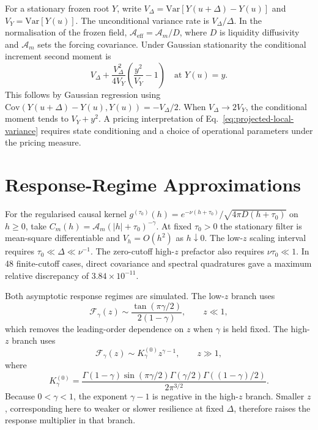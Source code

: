 \documentclass[11pt]{article}
\newcommand{\Aeff}{\mathcal A_{\mathrm{eff}}}
\newcommand{\Fresp}{\mathcal F}
\begin{document}
For a stationary frozen root \(Y\), write
\(V_\Delta=\mathrm{Var}[Y(u+\Delta)-Y(u)]\) and \(V_Y=\mathrm{Var}[Y(u)]\).
The unconditional variance rate is \(V_\Delta/\Delta\). In the normalisation
of the frozen field, \(\Aeff=\mathcal A_m/D\), where \(D\) is liquidity
diffusivity and \(\mathcal A_m\) sets the forcing covariance. Under Gaussian
stationarity the conditional increment second moment is
\[
 V_\Delta+\frac{V_\Delta^2}{4V_Y}\left(\frac{y^2}{V_Y}-1\right)
 \quad\text{at }Y(u)=y .
\]
This follows by Gaussian regression using
\(\mathrm{Cov}(Y(u+\Delta)-Y(u),Y(u))=-V_\Delta/2\).
When \(V_\Delta\to2V_Y\), the conditional moment tends to \(V_Y+y^2\).
A pricing interpretation of Eq.~\eqref{eq:projected-local-variance}
requires state conditioning and a choice of operational parameters under
the pricing measure.

\section{Response-Regime Approximations}

For the regularised causal kernel
\(g^{(\tau_0)}(h)=e^{-\nu(h+\tau_0)}/\sqrt{4\pi D(h+\tau_0)}\)
on \(h\ge0\), take \(C_m(h)=\mathcal A_m(|h|+\tau_0)^{-\gamma}\).
At fixed \(\tau_0>0\) the stationary filter is mean-square differentiable
and \(V_h=O(h^2)\) as \(h\downarrow0\). The low-\(z\) scaling interval
requires \(\tau_0\ll\Delta\ll\nu^{-1}\). The zero-cutoff high-\(z\)
prefactor also requires \(\nu\tau_0\ll1\). In 48 finite-cutoff cases,
direct covariance and spectral quadratures gave a maximum relative
discrepancy of \(3.84\times10^{-11}\).

Both asymptotic response regimes are simulated. The low-\(z\) branch uses
\begin{equation}
 \Fresp_\gamma(z)
 \sim
 \frac{\tan(\pi\gamma/2)}{2(1-\gamma)},
 \qquad z\ll1,
 \label{eq:low-z-response}
\end{equation}
which removes the leading-order dependence on \(z\) when \(\gamma\) is held
fixed. The high-\(z\) branch uses
\begin{equation}
 \Fresp_\gamma(z)
 \sim
 K_\gamma^{(0)}z^{\gamma-1},
 \qquad z\gg1,
 \label{eq:high-z-response}
\end{equation}
where
\begin{equation}
 K_\gamma^{(0)}
 =
 \frac{
 \Gamma(1-\gamma)\sin(\pi\gamma/2)
 \Gamma(\gamma/2)\Gamma((1-\gamma)/2)
 }{2\pi^{3/2}}.
 \label{eq:k-gamma}
\end{equation}
Because \(0<\gamma<1\), the exponent \(\gamma-1\) is negative in the
high-\(z\) branch. Smaller \(z\), corresponding here to weaker or slower
resilience at fixed \(\Delta\), therefore raises the response multiplier in
that branch.
\end{document}
